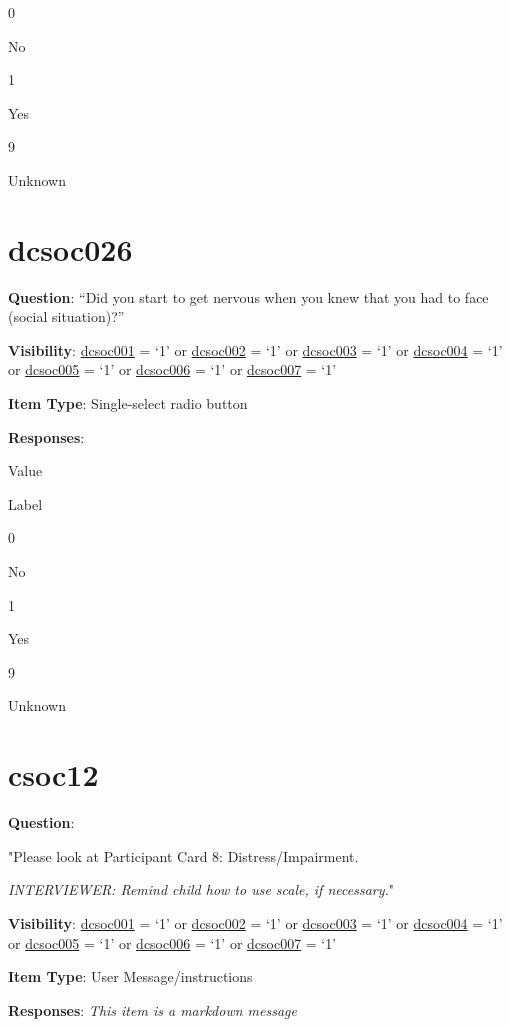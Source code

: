 \documentclass[]{book}
\begin{document}
0

No

1

Yes

9

Unknown

\hypertarget{dcsoc026}{%
\section{dcsoc026}\label{dcsoc026}}

\textbf{Question}: ``Did you start to get nervous when you knew that you had to face (social situation)?''

\textbf{Visibility}: \protect\hyperlink{dcsoc001}{dcsoc001} = `1' or \protect\hyperlink{dcsoc002}{dcsoc002} = `1' or \protect\hyperlink{dcsoc003}{dcsoc003} = `1' or \protect\hyperlink{dcsoc004}{dcsoc004} = `1' or \protect\hyperlink{dcsoc005}{dcsoc005} = `1' or \protect\hyperlink{dcsoc006}{dcsoc006} = `1' or \protect\hyperlink{dcsoc007}{dcsoc007} = `1'

\textbf{Item Type}: Single-select radio button

\textbf{Responses}:

Value

Label

0

No

1

Yes

9

Unknown

\hypertarget{csoc12}{%
\section{csoc12}\label{csoc12}}

\textbf{Question}:

"Please look at Participant Card 8: Distress/Impairment.

\emph{INTERVIEWER: Remind child how to use scale, if necessary.}"

\textbf{Visibility}: \protect\hyperlink{dcsoc001}{dcsoc001} = `1' or \protect\hyperlink{dcsoc002}{dcsoc002} = `1' or \protect\hyperlink{dcsoc003}{dcsoc003} = `1' or \protect\hyperlink{dcsoc004}{dcsoc004} = `1' or \protect\hyperlink{dcsoc005}{dcsoc005} = `1' or \protect\hyperlink{dcsoc006}{dcsoc006} = `1' or \protect\hyperlink{dcsoc007}{dcsoc007} = `1'

\textbf{Item Type}: User Message/instructions

\textbf{Responses}: \emph{This item is a markdown message}
\end{document}
